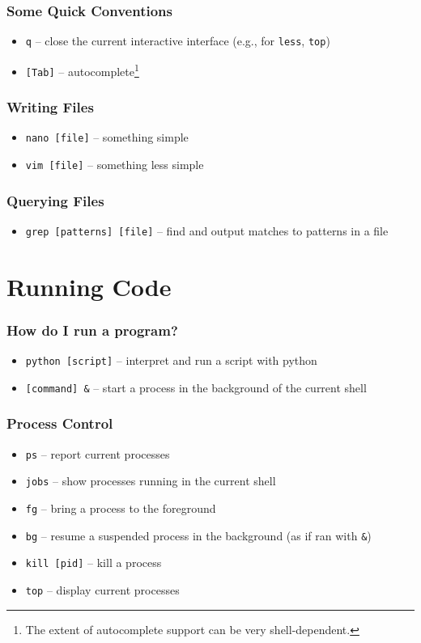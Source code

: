 \documentclass[aspectratio=169]{beamer}
\begin{document}
\begin{frame}
	\frametitle{Some Quick Conventions}
	\begin{itemize}
		\item \texttt{q} -- close the current interactive interface (e.g., for \texttt{less}, \texttt{top})
		\item \texttt{[Tab]} -- autocomplete\footnote{The extent of autocomplete support can be very shell-dependent.}
	\end{itemize}
\end{frame}

\begin{frame}
	\frametitle{Writing Files}
	\begin{itemize}
		\item \texttt{nano [file]} -- something simple
		\item \texttt{vim [file]} -- something less simple
	\end{itemize}
\end{frame}

\begin{frame}
	\frametitle{Querying Files}
	\begin{itemize}
		\item \texttt{grep [patterns] [file]} -- find and output matches to patterns in a file
	\end{itemize}
\end{frame}


\section{Running Code}

\frame{\sectionpage}

\begin{frame}
	\frametitle{How do I run a program?}
	\begin{itemize}
		\item \texttt{python [script]} -- interpret and run a script with python
		\item \texttt{[command] \&} -- start a process in the background of the current shell
	\end{itemize}
\end{frame}

\begin{frame}
	\frametitle{Process Control}
	\begin{itemize}
		\item \texttt{ps} -- report current processes
		\item \texttt{jobs} -- show processes running in the current shell
		\item \texttt{fg} -- bring a process to the foreground
		\item \texttt{bg} -- resume a suspended process in the background (as if ran with \texttt{\&})
		\item \texttt{kill [pid]} -- kill a process
		\item \texttt{top} -- display current processes
	\end{itemize}
\end{frame}
\end{document}
